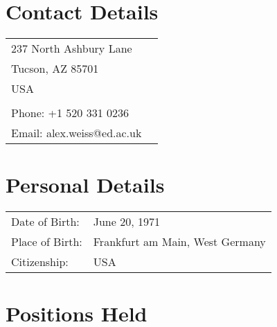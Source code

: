 \documentclass[11pt]{article}
\begin{document}

\noindent{\rule{\textwidth}{1pt}} \\

\section*{Contact Details}

\begin{tabular}{p{12cm}p{3cm}}
  237 North Ashbury Lane & \\
  Tucson, AZ 85701 & \\
  USA & \\ \\

  Phone: +1 520 331 0236 & \\
  Email: alex.weiss@ed.ac.uk &
\end{tabular}

\section*{Personal Details}

\begin{tabular}{p{3cm}p{12cm}}
Date of Birth: & June 20, 1971 \\
Place of Birth: & Frankfurt am Main, West Germany \\
Citizenship: & USA
\end{tabular}

\section*{Positions Held}
\end{document}
